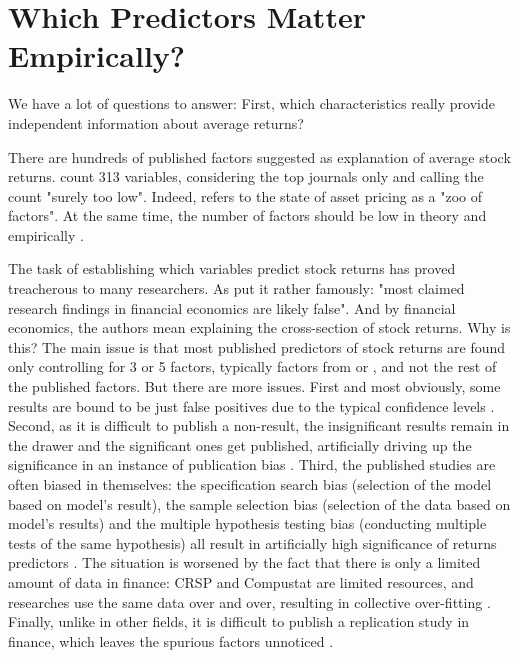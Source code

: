 	\section{Which Predictors Matter Empirically?} 
		
		\epigraph{We have a lot of questions to answer: First, which characteristics really provide independent information about average returns?}{\cite{cochrane2011presidential}}
		
		There are hundreds of published factors suggested as explanation of average stock returns. \cite{harvey2016and} count 313 variables, considering the top journals only and calling the count "surely too low". Indeed, \cite{cochrane2011presidential} refers to the state of asset pricing as a "zoo of factors". At the same time, 
		the number of factors should be low in theory \citep{cochrane2011presidential} and empirically \citep{ahn2012determining}.
		
		The task of establishing which variables predict stock returns has proved treacherous to many researchers.  As \cite[p.~5]{harvey2016and} put it rather famously: "most claimed research findings in financial economics are likely false". And by financial economics, the authors mean explaining the cross-section of stock returns. Why is this? The main issue is that most published predictors of stock returns are found only controlling for 3 or 5 factors, typically factors from  \cite{fama1996multifactor} or \cite{fama2015five}, and not the rest of the published factors. But there are more issues. First and most obviously, some results are bound to be just false positives due to the typical confidence levels \citep{harvey2016and}. Second, as it is difficult to publish a non-result, the insignificant results remain in the drawer and the significant ones get published, artificially driving up the significance in an instance of publication bias \citep{harvey2016and}. Third, the published studies are often biased in themselves: the specification search bias (selection of the model based on model's result), the sample selection bias (selection of the data based on model's results) and the multiple hypothesis testing bias (conducting multiple tests of the same hypothesis) all result in artificially high significance of returns predictors \citep{mclean2016does}. The situation is worsened by the fact that there is only a limited amount of data in finance: CRSP and Compustat are limited resources, and researches use the same data over and over, resulting in collective over-fitting \citep{harvey2016and}. Finally, unlike in other fields, it is difficult to publish a replication study in finance, which leaves the spurious factors unnoticed \citep{harvey2016and}. 
		
